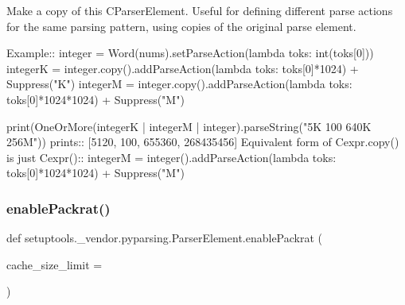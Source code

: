 \begin{DoxyVerb}Make a copy of this C{ParserElement}.  Useful for defining different parse actions
for the same parsing pattern, using copies of the original parse element.

Example::
    integer = Word(nums).setParseAction(lambda toks: int(toks[0]))
    integerK = integer.copy().addParseAction(lambda toks: toks[0]*1024) + Suppress("K")
    integerM = integer.copy().addParseAction(lambda toks: toks[0]*1024*1024) + Suppress("M")
    
    print(OneOrMore(integerK | integerM | integer).parseString("5K 100 640K 256M"))
prints::
    [5120, 100, 655360, 268435456]
Equivalent form of C{expr.copy()} is just C{expr()}::
    integerM = integer().addParseAction(lambda toks: toks[0]*1024*1024) + Suppress("M")
\end{DoxyVerb}
 \mbox{\label{classsetuptools_1_1__vendor_1_1pyparsing_1_1ParserElement_a93ea62f4f71af75efc5d024e262485b6}} 
\subsubsection{\texorpdfstring{enable\+Packrat()}{enablePackrat()}}
{\footnotesize\ttfamily def setuptools.\+\_\+vendor.\+pyparsing.\+Parser\+Element.\+enable\+Packrat (\begin{DoxyParamCaption}\item[{}]{cache\+\_\+size\+\_\+limit = {} }\end{DoxyParamCaption})\hspace{0.3cm}{\ttfamily [static]}}

